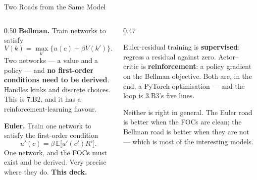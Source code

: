 \begin{frame}{Two Roads from the Same Model}
\begin{columns}[T]
\begin{column}{0.50\textwidth}
\small
\textbf{Bellman.} Train networks to satisfy
\[
  V(k)=\max_{k'}\{u(c)+\beta V(k')\} .
\]
Two networks --- a value and a policy --- and \textbf{no first-order conditions need to be derived}. Handles kinks and discrete choices. This is 7.B2, and it has a reinforcement-learning flavour.
\medskip

\textbf{Euler.} Train one network to satisfy the first-order condition
\[
  u'(c)=\beta\,\mathbb{E}\bigl[u'(c')R'\bigr] .
\]
One network, and the FOCs must exist and be derived. Very precise where they do. \textbf{This deck.}
\end{column}
\begin{column}{0.47\textwidth}
\begin{conceptbox}[title=\textbf{Which is which, in one word}]\small
Euler-residual training is \textbf{supervised}: regress a residual against zero.
\medskip
Actor--critic is \textbf{reinforcement}: a policy gradient on the Bellman objective.
\medskip
Both are, in the end, a PyTorch optimisation --- and the loop is 3.B3's five lines.
\end{conceptbox}
\medskip
\begin{takeawaybox}\footnotesize
Neither is right in general. The Euler road is better when the FOCs are clean; the Bellman road is better when they are not --- which is most of the interesting models.
\end{takeawaybox}
\end{column}
\end{columns}
\end{frame}

